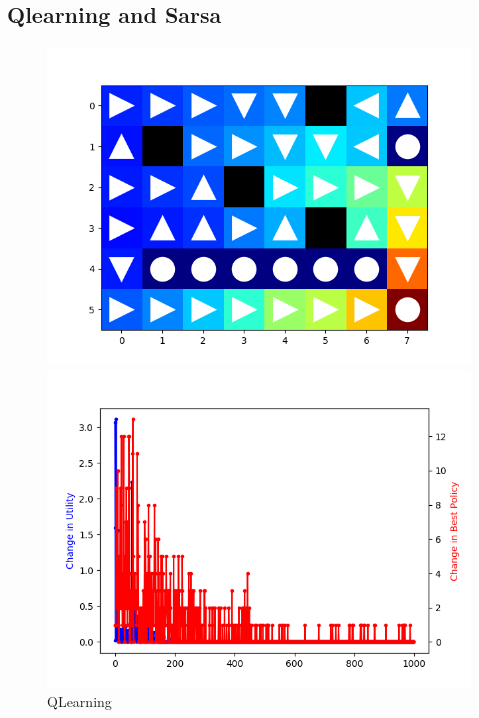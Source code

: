 \documentclass[aps,letterpaper,10pt]{revtex4}
\begin{document}
\subsection{Qlearning and Sarsa} 
\begin{figure}[htbp] 
    \centering 
    \begin{minipage}[t]{0.5\linewidth}
    \centering 
    \includegraphics[scale=0.5]{ql_e_greedy.png} 
    \end{minipage}%
    \begin{minipage}[t]{0.5\linewidth} 
    \centering 
    \includegraphics[scale=0.5]{ql_e_greedy_change.png} 
    \end{minipage}%
    \centering 
    \caption{QLearning} 
\end{figure}
\end{document}
